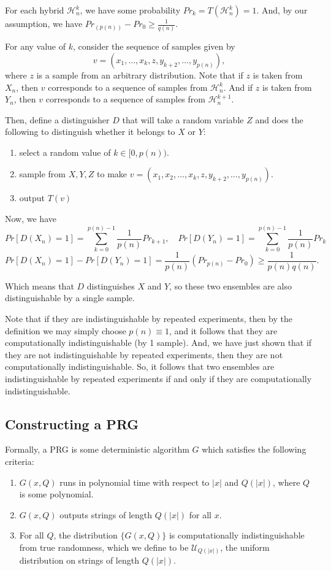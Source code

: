 \documentclass[11pt]{article}
\newcommand{\mcH}{\mathcal{H}}
\newcommand{\mcU}{\mathcal{U}}
\begin{document}
For each hybrid \(\mcH_n^k\), we have some probability \(Pr_k = T(\mcH_n^k)=1\). And, by our assumption, we have \(Pr_{(p(n))}-Pr_{0}\ge\frac{1}{q(n)}\). \smallskip

For any value of \(k\), consider the sequence of samples given by 
\[v = \left(x_1,\ldots,x_k, z, y_{k+2},\ldots,y_{p(n)}\right),\]
where \(z\) is a sample from an arbitrary distribution. Note that if \(z\) is taken from \(X_n\), then \(v\) corresponds to a sequence of samples from \(\mcH_n^k\). And if \(z\) is taken from \(Y_n\), then \(v\) corresponds to a sequence of samples from \(\mcH_n^{k+1}\).

Then, define a distinguisher \(D\) that will take a random variable \(Z\) and does the following to distinguish whether it belongs to \(X\) or \(Y\):
\begin{enumerate}
\item select a random value of \(k\in[0,p(n))\).
\item sample from \(X,Y,Z\) to make \(v=\left(x_1,x_2,\ldots,x_k,z,y_{k+2},\ldots,y_{p(n)}\right)\).
\item output \(T(v)\)
\end{enumerate}

Now, we have
\[Pr[D(X_n) = 1] = \sum_{k=0}^{p(n)-1} \frac{1}{p(n)} Pr_{k+1},\quad Pr[D(Y_n) = 1] = \sum_{k=0}^{p(n)-1} \frac{1}{p(n)} Pr_{k}\]
\[ Pr[D(X_n)=1]-Pr[D(Y_n)=1] = \frac{1}{p(n)}(Pr_{p(n)}-Pr_0) \ge \frac{1}{p(n)q(n)}.\]

Which means that \(D\) distinguishes \(X\) and \(Y\), so these two ensembles are also distinguishable by a single sample.\smallskip

Note that if they are indistinguishable by repeated experiments, then by the definition we may simply choose \(p(n)\equiv 1\), and it follows that they are computationally indistinguishable (by 1 sample). And, we have just shown that if they are not indistinguishable by repeated experiments, then they are not computationally indistinguishable. So, it follows that two ensembles are indistinguishable by repeated experiments if and only if they are computationally indistinguishable.



\newpage
\subsection{Constructing a PRG}
Formally, a PRG is some deterministic algorithm \(G\) which satisfies the following criteria:
\begin{enumerate}
\item \(G(x,Q)\) runs in polynomial time with respect to \(|x|\) and \(Q(|x|)\), where \(Q\) is some polynomial.
\item \(G(x,Q)\) outputs strings of length \(Q(|x|)\) for all \(x\).
\item For all \(Q\), the distribution \(\{G(x,Q)\}\) is computationally indistinguishable from true randomness, which we define to be \(\mcU_{Q(|x|)}\), the uniform distribution on strings of length \(Q(|x|)\).
\end{enumerate}
\end{document}
